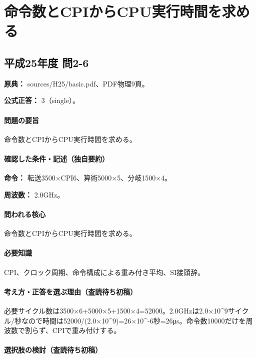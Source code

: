\section{命令数とCPIからCPU実行時間を求める}

\subsection{平成25年度 問2-6}
\label{q:h25-reg-basic-2-6}

\noindent\textbf{原典：} sources/H25/basic.pdf、PDF物理9頁。

\textbf{公式正答：} 3（single）。

\paragraph{問題の要旨} 命令数とCPIからCPU実行時間を求める。

\paragraph{確認した条件・記述（独自要約）}\mbox{}\par

\noindent\textbf{命令：} 転送3500×CPI6、算術5000×5、分岐1500×4。\par

\noindent\textbf{周波数：} 2.0GHz。\par

\paragraph{問われる核心} 命令数とCPIからCPU実行時間を求める。

\paragraph{必要知識} CPI、クロック周期、命令構成による重み付き平均、SI接頭辞。

\paragraph{考え方・正答を選ぶ理由（査読待ち初稿）} 必要サイクル数は3500×6+5000×5+1500×4=\allowbreak{}52000。2.0GHzは2.0×10\textasciicircum{}9サイクル/秒なので時間は52000/(2.0×10\textasciicircum{}9)=\allowbreak{}26×10\textasciicircum{}-6秒=26μs。命令数10000だけを周波数で割らず、CPIで重み付けする。

\paragraph{選択肢の検討（査読待ち初稿）}\mbox{}\par

